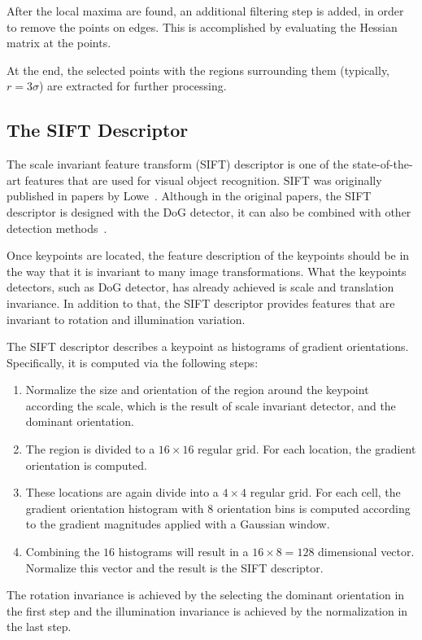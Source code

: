 \documentclass[12pt,final,twoside]{report}
\begin{document}
After the local maxima are found, an additional filtering step is added, in order to remove the points on edges. This is accomplished by evaluating the Hessian matrix at the points.

At the end, the selected points with the regions surrounding them (typically, $r = 3\sigma$) are extracted for further processing.

\subsection{The SIFT Descriptor}
The scale invariant feature transform (SIFT) descriptor is one of the state-of-the-art features that are used for visual object recognition. SIFT was originally published in papers by Lowe~\cite{lowe_object_1999,lowe_distinctive_2004}. 
Although in the original papers, the SIFT descriptor is designed with the DoG detector, it can also be combined with other detection methods~\cite{mikolajczyk_performance_2005}.

Once keypoints are located, the feature description of the keypoints should be in the way that it is invariant to many image transformations. What the keypoints detectors, such as DoG detector, has already achieved is scale and translation invariance. In addition to that, the SIFT descriptor provides features that are invariant to rotation and illumination variation.

The SIFT descriptor describes a keypoint as histograms of gradient orientations. Specifically, it is computed via the following steps:
\begin{enumerate}
  \item Normalize the size and orientation of the region around the keypoint according the scale, which is the result of scale invariant detector, and the dominant orientation.
  \item The region is divided to a $16 \times 16$ regular grid. For each location, the gradient orientation is computed.
  \item These locations are again divide into a $4 \times 4$ regular grid. For each cell, the gradient orientation histogram with 8 orientation bins is computed according to the gradient magnitudes applied with a Gaussian window.
  \item Combining the $16$ histograms will result in a $16 \times 8 = 128$ dimensional vector. Normalize this vector and the result is the SIFT descriptor.
\end{enumerate}

The rotation invariance is achieved by the selecting the dominant orientation in the first step and the illumination invariance is achieved by the normalization in the last step.
\end{document}
